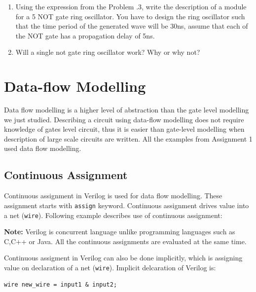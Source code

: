 \documentclass[a4paper,10pt]{article}
\theoremstyle{mytheor}
\newcommand{
  \insertverilog}[3]{
  
}
\newcounter{problemNumber}
\begin{document}
{\begin {enumerate}
  \item Using the expression from the Problem {\theproblemNumber}.3,
    write the description of a module for a 5 NOT gate ring
    oscillator. You have to design the ring oscillator such that the
    time period of the generated wave will be 30ns, assume that each
    of the NOT gate has a propagation delay of 5ns.
  \item Will a single not gate ring oscillator work? Why or why not?
  \end{enumerate}
} 


\section{Data-flow Modelling}
Data flow modelling is a higher level of abstraction than the gate
level modelling we just studied. Describing a circuit using data-flow
modelling does not require knowledge of gates level circuit, thus it
is easier than gate-level modelling when description of large scale
circuits are written.  All the examples from Assignment 1 used data
flow modelling.

\subsection{Continuous Assignment}
\label{continuous-assignment}
Continuous assignment in Verilog is used for data flow modelling.
These assignment starts with
\lstinline[style=verilog-inline-style]{assign} keyword. Continuous
assignment drives value into a net
(\lstinline[style=verilog-inline-style]{wire}). Following example
describes use of continuous assignment:

{\color{red}\textbf{Note:}} Verilog is concurrent language unlike
programming languages such as C,C++ or Java. All the continuous
assignments are evaluated at the same time.

\insertverilog{./verilog_files/continuousAssignment.v}{continuous-assignment}{Example usage of continuous assignment.}

Continuous assigment in Verilog can also be done implicitly, which is
assigning value on declaration of a net
(\lstinline[style=verilog-inline-style]{wire}). Implicit delcaration
of Verilog is:
\begin{lstlisting}[style=verilog-inline-style,xleftmargin=.25\textwidth]
  wire new_wire = input1 & input2;
\end{lstlisting}
\end{document}
